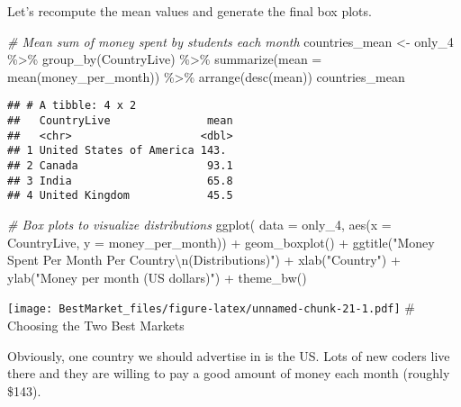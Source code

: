 \documentclass[
]{article}
\newenvironment{Shaded}{\begin{snugshade}}{\end{snugshade}}
\newcommand{\AttributeTok}[1]{\textcolor[rgb]{0.77,0.63,0.00}{#1}}
\newcommand{\CommentTok}[1]{\textcolor[rgb]{0.56,0.35,0.01}{\textit{#1}}}
\newcommand{\FunctionTok}[1]{\textcolor[rgb]{0.00,0.00,0.00}{#1}}
\newcommand{\NormalTok}[1]{#1}
\newcommand{\OtherTok}[1]{\textcolor[rgb]{0.56,0.35,0.01}{#1}}
\newcommand{\SpecialCharTok}[1]{\textcolor[rgb]{0.00,0.00,0.00}{#1}}
\newcommand{\StringTok}[1]{\textcolor[rgb]{0.31,0.60,0.02}{#1}}
\begin{document}
Let's recompute the mean values and generate the final box plots.

\begin{Shaded}
\begin{Highlighting}[]
\CommentTok{\# Mean sum of money spent by students each month}
\NormalTok{countries\_mean }\OtherTok{\textless{}{-}}\NormalTok{ only\_4 }\SpecialCharTok{\%\textgreater{}\%}
  \FunctionTok{group\_by}\NormalTok{(CountryLive) }\SpecialCharTok{\%\textgreater{}\%}
  \FunctionTok{summarize}\NormalTok{(}\AttributeTok{mean =} \FunctionTok{mean}\NormalTok{(money\_per\_month)) }\SpecialCharTok{\%\textgreater{}\%}
  \FunctionTok{arrange}\NormalTok{(}\FunctionTok{desc}\NormalTok{(mean))}
\NormalTok{countries\_mean}
\end{Highlighting}
\end{Shaded}

\begin{verbatim}
## # A tibble: 4 x 2
##   CountryLive               mean
##   <chr>                    <dbl>
## 1 United States of America 143. 
## 2 Canada                    93.1
## 3 India                     65.8
## 4 United Kingdom            45.5
\end{verbatim}

\begin{Shaded}
\begin{Highlighting}[]
\CommentTok{\# Box plots to visualize distributions}
\FunctionTok{ggplot}\NormalTok{( }\AttributeTok{data =}\NormalTok{ only\_4, }\FunctionTok{aes}\NormalTok{(}\AttributeTok{x =}\NormalTok{ CountryLive, }\AttributeTok{y =}\NormalTok{ money\_per\_month)) }\SpecialCharTok{+}
  \FunctionTok{geom\_boxplot}\NormalTok{() }\SpecialCharTok{+}
  \FunctionTok{ggtitle}\NormalTok{(}\StringTok{"Money Spent Per Month Per Country}\SpecialCharTok{\textbackslash{}n}\StringTok{(Distributions)"}\NormalTok{) }\SpecialCharTok{+}
  \FunctionTok{xlab}\NormalTok{(}\StringTok{"Country"}\NormalTok{) }\SpecialCharTok{+}
  \FunctionTok{ylab}\NormalTok{(}\StringTok{"Money per month (US dollars)"}\NormalTok{) }\SpecialCharTok{+}
  \FunctionTok{theme\_bw}\NormalTok{()}
\end{Highlighting}
\end{Shaded}

\texttt{[image: BestMarket\_files/figure-latex/unnamed-chunk-21-1.pdf]}
\# Choosing the Two Best Markets

Obviously, one country we should advertise in is the US. Lots of new
coders live there and they are willing to pay a good amount of money
each month (roughly \$143).
\end{document}
